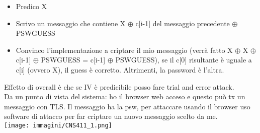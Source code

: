 \documentclass[16px]{article}
\begin{document}
\begin{itemize}
\item Predico X
\item Scrivo un messaggio che contiene X $\oplus$ c[i-1] del messaggio precedente $\oplus$ PSWGUESS
\item Convinco l'implementazione a criptare il mio messaggio (verrà fatto X $\oplus$ X $\oplus$ c[i-1] $\oplus$ PSWGUESS = c[i-1] $\oplus$ PSWGUESS), se il c[0] risultante è uguale a c[i] (ovvero X), il guess è corretto. Altrimenti, la password è l'altra.
\end{itemize}
Effetto di overall è che se IV è predicibile posso fare trial and error attack.\\ Da un punto di vista del sistema: ho il browser web acceso e questo può tx un messaggio con TLS. Il messaggio ha la psw, per attaccare usando il browser uso software di attacco per far criptare un nuovo messaggio scelto da me.\\
\texttt{[image: immagini/CNS411\_1.png]}
\end{document}
